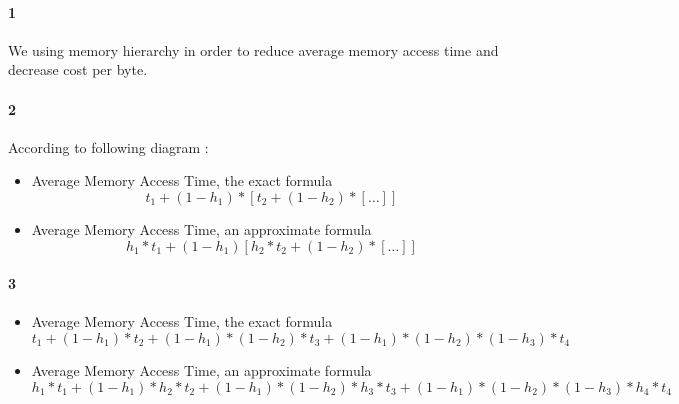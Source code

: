 \documentclass[11pt]{article}
\begin{document}
\paragraph{1}
We using memory hierarchy in order to reduce average memory access time and
decrease cost per byte.
\paragraph{2}
According to following diagram :


\begin{itemize}
\item
	Average Memory Access Time, the exact formula
	\begin{equation}
		\label{eq:AMAT-e}
		t_1 + (1 - h_1) * [t_2 + (1 - h_2) * [\ldots]]
	\end{equation}	
\item
	Average Memory Access Time, an approximate formula
	\begin{equation}
		\label{eq:AMAT-a}
		h_1 * t_1 + (1 - h_1) [h_2 * t_2 + (1 - h_2) * [\ldots]]
	\end{equation}
\end{itemize}
\paragraph{3}
\begin{itemize}
\item
	Average Memory Access Time, the exact formula
	\begin{equation}
		\label{eq:AMAT-e-4}
		t_1 + (1 - h_1) * t_2 + (1 - h_1) * (1 - h_2) * t_3 + (1 - h_1) * (1 - h_2) * (1 - h_3) * t_4
	\end{equation}
\item
	Average Memory Access Time, an approximate formula
	\begin{equation}
		\label{eq:AMAT-a-4}
		h_1 * t_1 + (1 - h_1) * h_2 * t_2 + (1 - h_1) * (1 - h_2) * h_3 * t_3 + (1 - h_1) * (1 - h_2) * (1 - h_3) * h_4 * t_4
	\end{equation}
\end{itemize}
\end{document}
